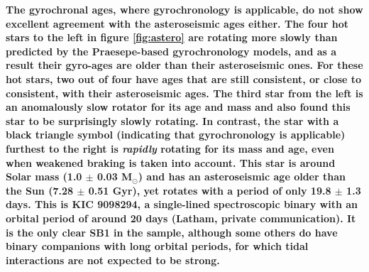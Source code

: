 \documentclass[useAMS, usenatbib, preprint, 12pt]{aastex}
\newcommand{\racomment}[1]{{\bf #1}}
\begin{document}
\racomment{
The gyrochronal ages, where gyrochronology is applicable, do not show
excellent agreement with the asteroseismic ages either.
The four hot stars to the left in figure \ref{fig:astero} are rotating more
slowly than predicted by the Praesepe-based gyrochronology models, and as a
result their gyro-ages are older than their asteroseismic ones.
For these hot stars, two out of four have ages that are still consistent, or
close to consistent, with their asteroseismic ages.
The third star from the left is an anomalously slow rotator for its age and
mass and \citet{vansaders2016} also found this star to be surprisingly slowly
rotating.
In contrast, the star with a black triangle symbol (indicating that
gyrochronology is applicable) furthest to the right is {\it rapidly} rotating
for its mass and age, even when weakened braking is taken into account.
This star is around Solar mass (1.0 $\pm$ 0.03 M$_\odot$) and has an
asteroseismic age older than the Sun (7.28 $\pm$ 0.51 Gyr), yet rotates with a
period of only 19.8 $\pm$ 1.3 days.
This is KIC 9098294, a single-lined spectroscopic binary with an orbital
period of around 20 days (Latham, private communication).
It is the only clear SB1 in the \citet{vansaders2016} sample, although some
others do have binary companions with long orbital periods, for which tidal
interactions are not expected to be strong.
}
\end{document}
